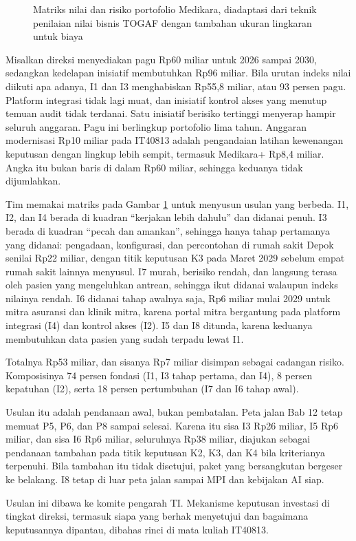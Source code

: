 \begin{figure}[!htb]
  \centering
  
  \caption{Matriks nilai dan risiko portofolio Medikara, diadaptasi dari
           teknik penilaian nilai bisnis TOGAF dengan tambahan ukuran
           lingkaran untuk biaya}
  \label{fig:ch13-matriks}
\end{figure}

\begin{kasus}[title={Kasus Medikara Health: Memutuskan Portofolio 2026 sampai 2030}]
Misalkan direksi menyediakan pagu Rp60 miliar untuk 2026 sampai 2030,
sedangkan kedelapan inisiatif membutuhkan Rp96 miliar. Bila urutan indeks
nilai diikuti apa adanya, I1 dan I3 menghabiskan Rp55,8 miliar, atau 93
persen pagu. Platform integrasi tidak lagi muat, dan inisiatif kontrol akses
yang menutup temuan audit tidak terdanai. Satu inisiatif berisiko tertinggi
menyerap hampir seluruh anggaran. Pagu ini berlingkup portofolio lima tahun.
Anggaran modernisasi Rp10 miliar pada IT40813 adalah pengandaian latihan
kewenangan keputusan dengan lingkup lebih sempit, termasuk Medikara+ Rp8,4
miliar. Angka itu bukan baris di dalam Rp60 miliar, sehingga keduanya tidak
dijumlahkan.

Tim memakai matriks pada Gambar \ref{fig:ch13-matriks} untuk menyusun usulan
yang berbeda. I1, I2, dan I4 berada di kuadran ``kerjakan lebih dahulu'' dan
didanai penuh. I3 berada di kuadran ``pecah dan amankan'', sehingga hanya
tahap pertamanya yang didanai: pengadaan, konfigurasi, dan percontohan di rumah
sakit Depok senilai Rp22 miliar, dengan titik keputusan K3 pada Maret 2029
sebelum empat rumah sakit lainnya menyusul. I7 murah, berisiko rendah, dan langsung terasa oleh pasien
yang mengeluhkan antrean, sehingga ikut didanai walaupun indeks nilainya
rendah. I6 didanai tahap awalnya saja, Rp6 miliar mulai 2029 untuk mitra
asuransi dan klinik mitra, karena portal mitra bergantung pada platform
integrasi (I4) dan kontrol akses (I2). I5 dan I8 ditunda, karena keduanya
membutuhkan data pasien yang sudah terpadu lewat I1.

Totalnya Rp53 miliar, dan sisanya Rp7 miliar disimpan sebagai cadangan
risiko. Komposisinya 74 persen fondasi (I1, I3 tahap pertama, dan I4), 8
persen kepatuhan (I2), serta 18 persen pertumbuhan (I7 dan I6 tahap awal).

Usulan itu adalah pendanaan awal, bukan pembatalan. Peta jalan Bab 12 tetap memuat
P5, P6, dan P8 sampai selesai. Karena itu sisa I3 Rp26 miliar, I5 Rp6 miliar, dan
sisa I6 Rp6 miliar, seluruhnya Rp38 miliar, diajukan sebagai pendanaan tambahan
pada titik keputusan K2, K3, dan K4 bila kriterianya terpenuhi. Bila tambahan itu
tidak disetujui, paket yang bersangkutan bergeser ke belakang. I8 tetap di luar
peta jalan sampai MPI dan kebijakan AI siap.

Usulan ini dibawa ke komite pengarah TI. Mekanisme keputusan investasi di
tingkat direksi, termasuk siapa yang berhak menyetujui dan bagaimana
keputusannya dipantau, dibahas rinci di mata kuliah IT40813.
\end{kasus}

